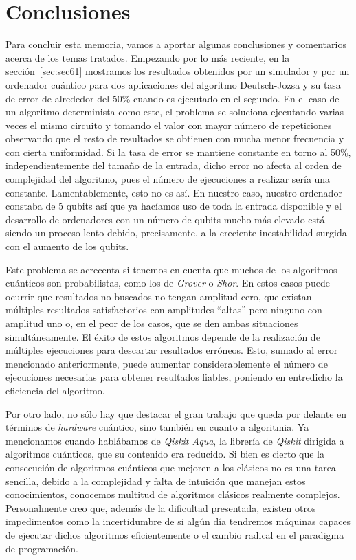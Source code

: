 \chapter{Conclusiones}
\label{chapter7}

Para concluir esta memoria, vamos a aportar algunas conclusiones y comentarios acerca de los temas tratados.
%
Empezando por lo más reciente, en la sección~\ref{sec:sec61} mostramos  los resultados obtenidos por un simulador y por un ordenador cuántico para dos aplicaciones del algoritmo Deutsch-Jozsa y su tasa de error de alrededor del 50\% cuando es ejecutado en el segundo. En el caso de un algoritmo determinista como este, el problema se soluciona ejecutando varias veces el mismo circuito y tomando el valor con mayor número de repeticiones observando que el resto de resultados se obtienen con mucha menor frecuencia y con cierta uniformidad. Si la tasa de error se mantiene constante en torno al 50\%, independientemente del tamaño de la entrada, dicho error no afecta al orden de complejidad del algoritmo, pues el número de ejecuciones a realizar sería una constante. Lamentablemente, esto no es así. En nuestro caso, nuestro ordenador constaba de 5 qubits así que ya hacíamos uso de toda la entrada disponible y el desarrollo de ordenadores con un número de qubits mucho más elevado está siendo un proceso lento debido, precisamente, a la creciente inestabilidad surgida con el aumento de los qubits.

Este problema se acrecenta si tenemos en cuenta que muchos de los algoritmos cuánticos son probabilistas, como los de \textit{Grover} o \textit{Shor}. En estos casos puede ocurrir que  resultados no buscados no tengan amplitud cero,  que existan múltiples resultados satisfactorios con amplitudes ``altas'' pero ninguno con amplitud uno o, en el peor de los casos, que se den ambas situaciones simultáneamente. El éxito de estos algoritmos depende de la realización de múltiples ejecuciones para descartar resultados erróneos. Esto, sumado al error mencionado anteriormente, puede aumentar considerablemente el número de ejecuciones necesarias para obtener resultados fiables, poniendo en entredicho la eficiencia del algoritmo.

Por otro lado, no sólo hay que destacar el gran trabajo que queda por delante en términos de \textit{hardware} cuántico, sino también en cuanto a algoritmia. Ya mencionamos cuando hablábamos de \textit{Qiskit Aqua}, la librería de \textit{Qiskit} dirigida a algoritmos cuánticos, que su contenido era reducido. Si bien es cierto que la consecución de algoritmos cuánticos que mejoren a los clásicos no es una tarea sencilla, debido a la complejidad y falta de intuición que manejan estos conocimientos, conocemos multitud de algoritmos clásicos realmente complejos. Personalmente creo que, además de la dificultad presentada, existen otros impedimentos como la incertidumbre de si algún día tendremos máquinas capaces de ejecutar dichos algoritmos eficientemente o el cambio radical en el paradigma de programación.

